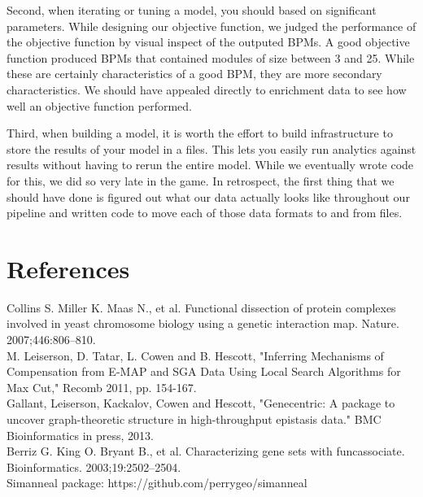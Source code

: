 \documentclass[11pt]{article}
\begin{document}
\par Second, when iterating or tuning a model, you should based on significant parameters. While designing our objective function, we judged the performance of the objective function by visual inspect of the outputed BPMs. A good objective function produced BPMs that contained modules of size between 3 and 25. While these are certainly characteristics of a good BPM, they are more secondary characteristics. We should have appealed directly to enrichment data to see how well an objective function performed. 
		
\par Third, when building a model, it is worth the effort to build infrastructure to store the results of your model in a files. This lets you easily run analytics against results without having to rerun the entire model. While we eventually wrote code for this, we did so very late in the game. In retrospect, the first thing that we should have done is figured out what our data actually looks like throughout our pipeline and written code to move each of those data formats to and from files.

		
	
  


\section{References}
Collins S. Miller K. Maas N., et al. Functional dissection of protein complexes involved in yeast chromosome biology using a genetic interaction map. Nature. 2007;446:806–810.\\

M. Leiserson, D. Tatar, L. Cowen and B. Hescott, "Inferring Mechanisms of Compensation from E-MAP and SGA Data Using Local Search Algorithms for Max Cut," Recomb 2011, pp. 154-167.\\

Gallant, Leiserson, Kackalov, Cowen and Hescott, "Genecentric: A package to uncover graph-theoretic structure in high-throughput epistasis data." BMC Bioinformatics in press, 2013.\\

Berriz G. King O. Bryant B., et al. Characterizing gene sets with funcassociate. Bioinformatics. 2003;19:2502–2504.\\

Simanneal package: https://github.com/perrygeo/simanneal\\
\end{document}

